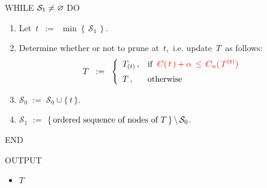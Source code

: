 \begin{center}
\begin{tcolorbox}[width=0.90\linewidth,colback=white,colframe=gray]
\begin{center}
\begin{minipage}{0.85\linewidth}
WHILE \;$\mathcal{S}_{1} \neq \varnothing$\; DO
\begin{enumerate}
\item
	Let \,$t$ \,$:=$\, $\min\!\left\{\,\mathcal{S}_{1}\,\right\}$.
\item
	Determine whether or not to prune at \,$t$,\, i.e. update \,$T$\, as follows:
	\begin{equation*}
	T \;\; := \;\;
	\left\{\begin{array}{ll}
		T_{(t)}\,, & \textnormal{if}\;\; {\color{red}C(\,t\,) + \alpha \,\leq\, C_{\alpha}(\,T^{(t)})}
		\\
		T\,, & \overset{{\color{white}1}}{\textnormal{otherwise}}
		\end{array}\right.
	\end{equation*}
\item
	$\mathcal{S}_{0} \; := \; \mathcal{S}_{0} \cup \{\,t\,\}$.
\item
	$\mathcal{S}_{1}$
	\;$:=$\;
		$\left\{\,\textnormal{ordered sequence of nodes of $T$}\,\right\} \backslash \, \mathcal{S}_{0}$.
\end{enumerate}
END
\end{minipage}
\end{center}
\vskip 0.3cm
OUTPUT
\begin{itemize}
\item
	$T$
\end{itemize}
\vskip 0.1cm
\end{tcolorbox}
\end{center}

